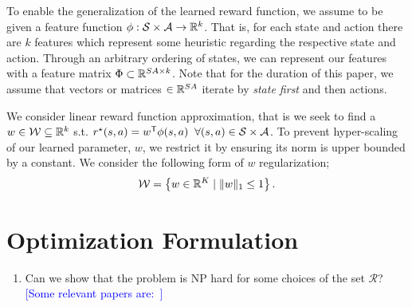\documentclass[11pt]{uai2023}
\newcommand{\mm}[1]{\textcolor{blue}{[#1]}}
\begin{document}

To enable the generalization of the learned reward function, we assume to be given a feature function $\phi: \mathcal{S} \times \mathcal{A}\to \mathbb{R}^k$. That is, for each state and action there are $k$ features which represent some heuristic regarding the respective state and action. Through an arbitrary ordering of states, we can represent our features with a feature matrix $\Phi \subset \mathbb{R}^{SA\times k}$. Note that for the duration of this paper, we assume that vectors or matrices $\in \mathbb{R}^{SA}$ iterate by \emph{state first} and then actions.

We consider linear reward function approximation, that is we seek to find a $w \in \mathcal{W} \subseteq \mathbb{R}^k$ s.t. $r^{\mathnormal{\star}}(s, a) = w^{\mathsf{T}}
	\phi(s,a) \;\; \forall (s,a) \in \mathcal{S}\times\mathcal{A}$. To
prevent hyper-scaling of our learned parameter, $w$, we restrict it by
ensuring its norm is upper bounded by a constant. We consider the following
form of $w$ regularization;
\[
  \mathcal{W} = \left\{ w \in \mathbb{R}^K
    \mid \| w \|_1 \le 1 \right\}.
\]




\section{Optimization Formulation}\label{sec:optimization-formulation}
\begin{enumerate}
	\item Can we show that the problem is NP hard for some choices of the set $\mathcal{R}$? \mm{Some relevant papers are:~\cite{Wu2013,Eldar2008}}
\end{enumerate}
\end{document}
